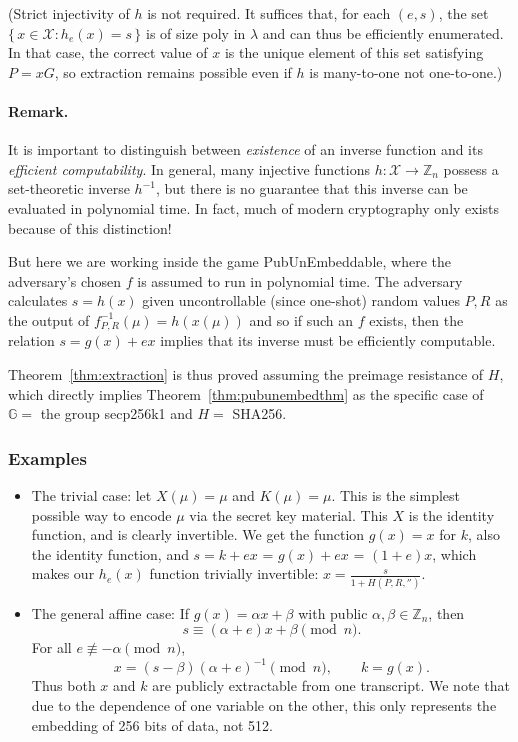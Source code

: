 \documentclass[10pt,a4paper]{article}
\theoremstyle{definition}   %
\theoremstyle{remark}       %
\newcommand{\G}{\mathbb{G}}
\begin{document}
(Strict injectivity of $h$ is not required. It suffices that, for each $(e,s)$, the set
$\{\,x \in \mathcal{X} : h_e(x) = s\,\}$ is of size poly in $\lambda$ and can thus be efficiently enumerated. In that case, the correct value of $x$ is the unique element of this set satisfying $P = xG$, so extraction remains possible even if $h$ is many-to-one not one-to-one.)

\vskip 0.2in

\paragraph{Remark.}
It is important to distinguish between \emph{existence} of an inverse
function and its \emph{efficient computability}.
In general, many injective functions $h:\mathcal X \to \mathbb{Z}_n$
possess a set-theoretic inverse $h^{-1}$, but there is no guarantee that
this inverse can be evaluated in polynomial time.
In fact, much of modern cryptography only exists because of this distinction!

\vskip 0.1in

But here we are working inside the game PubUnEmbeddable, where
the adversary's chosen $f$ is assumed to run in polynomial time. The adversary calculates $s=h(x)$ given uncontrollable (since one-shot) random values $P, R$ as the output of $f^{-1}_{P, R}(\mu) =h(x(\mu))$ and so if such an $f$ exists, then the relation $s = g(x)+ex$ implies that its inverse must be efficiently computable.

\vskip 0.2in

Theorem~\ref{thm:extraction} is thus proved assuming the preimage resistance of $H$, which directly implies Theorem~\ref{thm:pubunembedthm} as the specific case of $\G =$ the group secp256k1 and $H =$ SHA256.


\subsubsection*{Examples}

\begin{itemize}
\item The trivial case: let $X(\mu) = \mu$ and $K(\mu) = \mu$. This is the simplest possible way to encode $\mu$ via the secret key material. This $X$ is the identity function, and is clearly invertible. We get the function $g(x) = x$ for $k$, also the identity function, and $s = k + ex$ = $g(x) + ex$ = $(1+e)x$, which makes our $h_e(x)$ function trivially invertible: $x = \frac{s}{1 + H(P, R, '')}$.
\item The general affine case: If $g(x)=\alpha x+\beta$ with public $\alpha,\beta\in\mathbb{Z}_n$, then
\[
s \equiv (\alpha+e)x + \beta \pmod n.
\]
For all $e\not\equiv -\alpha \pmod n$,
\[
x = (s-\beta)(\alpha+e)^{-1}\pmod n,\qquad k=g(x).
\]
Thus both $x$ and $k$ are publicly extractable from one transcript. We note that due to the dependence of one variable on the other, this only represents the embedding of 256 bits of data, not 512.
\end{itemize}
\end{document}
